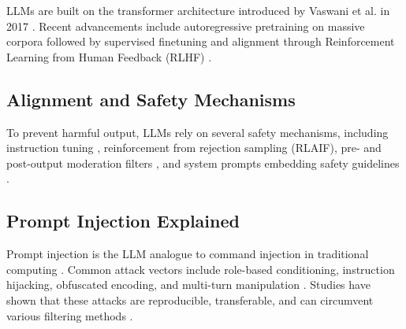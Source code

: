 \documentclass[conference]{IEEEtran}
\begin{document}
LLMs are built on the transformer architecture introduced by Vaswani et al. in 2017 \cite{vaswani2023attentionneed47}. Recent advancements include autoregressive pretraining on massive corpora followed by supervised finetuning and alignment through Reinforcement Learning from Human Feedback (RLHF) \cite{ziegler2020finetuning34}.

\subsection{Alignment and Safety Mechanisms}
To prevent harmful output, LLMs rely on several safety mechanisms, including instruction tuning \cite{Huang_2025_28}, reinforcement from rejection sampling (RLAIF), pre- and post-output moderation filters \cite{llmapplications16}, and system prompts embedding safety guidelines \cite{zhang2024goalguided12}\cite{raffel2023exploring33}.

\subsection{Prompt Injection Explained}
Prompt injection is the LLM analogue to command injection in traditional computing \cite{liu2024promptinjection1}\cite{liu2024automatic3}\cite{formalizing6}. Common attack vectors include role-based conditioning, instruction hijacking, obfuscated encoding, and multi-turn manipulation \cite{liu2024jailbreaking2}\cite{rossi2024earlycategorization5}\cite{rahman2024finetuned7}. Studies have shown that these attacks are reproducible, transferable, and can circumvent various filtering methods \cite{liu2024automatic3}\cite{kokkula2024palisade10}\cite{debenedetti2025defeating14}.
\end{document}
